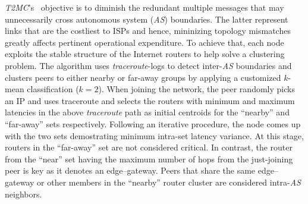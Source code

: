 \emph{T2MC}'s~\cite{SLCGZ2008} objective is to diminish the redundant multiple
messages that may unnecessarily cross autonomous system (\emph{AS}) boundaries.
The latter represent links that are the costliest to ISPs and hence, 
mininizing topology mismatches  greatly affects pertinent operational expenditure.
To achieve that, each node exploits the stable structure of
the Internet routers to help solve a clustering problem. 
The algorithm uses {\sl traceroute}-logs to detect inter-\emph{AS} boundaries 
and clusters peers to either nearby or 
far-away groups by applying a customized $k$-mean classification ($k=2$).
When joining the network, the peer randomly picks an IP and uses
traceroute and selects the routers with
minimum and maximum latencies in the above {\sl traceroute} path 
as initial centroids for the ``nearby'' and ``far-away'' sets respectively.
Following an iterative procedure, the node comes up with the two sets 
demostrating minimum intra-set latency variance.
At this stage, routers in the ``far-away'' set are not considered critical.
% 
% 
In contrast, the router from the ``near'' set
having the maximum number of hops 
from the just-joining peer is key as it denotes an edge--gateway. 
Peers that share the same edge--gateway or other members in the ``nearby'' 
router cluster are considered intra-\emph{AS} neighbors.

